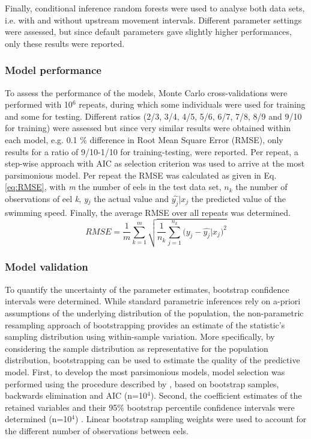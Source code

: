 \documentclass[preprint,12pt,authoryear]{elsarticle}
\begin{document}
Finally, conditional inference random forests were used to analyse both data sets, i.e. with and without upstream movement intervals. Different parameter settings were assessed, but since default parameters gave slightly higher performances, only these results were reported. 

\subsubsection{Model performance}

To assess the performance of the models, Monte Carlo cross-validations were performed with 10$^{6}$ repeats, during which some individuals were used for training and some for testing. Different ratios (2/3, 3/4, 4/5, 5/6, 6/7, 7/8, 8/9 and 9/10 for training) were assessed but since very similar results were obtained within each model, e.g. 0.1 \% difference in Root Mean Square Error (RMSE), only results for a ratio of 9/10-1/10 for training-testing, were reported. Per repeat, a step-wise approach with AIC as selection criterion was used to arrive at the most parsimonious model. Per repeat the RMSE was calculated as given in Eq. \ref{eq:RMSE}, with \textit{m} the number of eels in the test data set, \textit{$n_{k}$} the number of observations of eel \textit{k}, \textit{y$_{j}$} the actual value and $\widehat{y_{j}}|x_{j}$ the predicted value of the swimming speed. Finally, the average RMSE over all repeats was determined. 
\begin{equation}
\label{eq:RMSE}
RMSE = \frac{1}{m}\sum_{k=1}^{m}\sqrt{\frac{1}{n_{k}}\sum_{j=1}^{n_{k}}{{(y_j -\widehat{y_{j}}|x_{j}})^2}}
\end{equation}

\subsubsection{Model validation}

To quantify the uncertainty of the parameter estimates, bootstrap confidence intervals were determined. While standard parametric inferences rely on a-priori assumptions of the underlying distribution of the population, the non-parametric resampling approach of bootstrapping provides an estimate of the statistic's sampling distribution using within-sample variation. More specifically, by considering the sample distribution as representative for the population distribution, bootstrapping can be used to estimate the quality of the predictive model. First, to develop the most parsimonious models, model selection was performed using the procedure described by \cite{Austin2004BootstrapModels}, based on bootstrap samples, backwards elimination and AIC (n=10$^{4}$). Second, the coefficient estimates of the retained variables and their 95\% bootstrap percentile confidence intervals were determined (n=10$^{4}$) \citep{Davison1997BootstrapApplication}. Linear bootstrap sampling weights were used to account for the different number of observations between eels.
\end{document}
